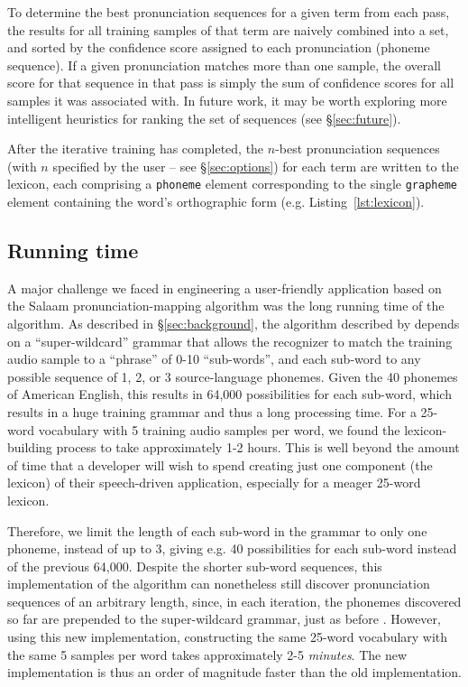 \documentclass[11pt]{article}
\begin{document}
To determine the best pronunciation sequences for a given term from each pass, the results for all training samples of that term are naively combined into a set, and sorted by the confidence score assigned to each pronunciation (phoneme sequence). If a given pronunciation matches more than one sample, the overall score for that sequence in that pass is simply the sum of confidence scores for all samples it was associated with. In future work, it may be worth exploring more intelligent heuristics for ranking the set of sequences (see \S\ref{sec:future}).

After the iterative training has completed, the $n$-best pronunciation sequences (with $n$ specified by the user -- see \S\ref{sec:options}) for each term are written to the lexicon, each comprising a \texttt{phoneme} element corresponding to the single \texttt{grapheme} element containing the word's orthographic form (e.g. Listing~\ref{lst:lexicon}).

\subsection{Running time}
\label{sec:runningtime}

A major challenge we faced in engineering a user-friendly application based on the Salaam pronunciation-mapping algorithm \cite{Qiao10} was the long running time of the algorithm. As described in \S\ref{sec:background}, the algorithm described by  depends on a ``super-wildcard'' grammar that allows the recognizer to match the training audio sample to a ``phrase'' of 0-10 ``sub-words'', and each sub-word to any possible sequence of 1, 2, or 3 source-language phonemes. Given the 40 phonemes of American English, this results in 64,000 possibilities for each sub-word, which results in a huge training grammar and thus a long processing time. For a 25-word vocabulary with 5 training audio samples per word, we found the lexicon-building process to take approximately 1-2 hours. This is well beyond the amount of time that a developer will wish to spend creating just one component (the lexicon) of their speech-driven application, especially for a meager 25-word lexicon. 

Therefore, we limit the length of each sub-word in the grammar to only one phoneme, instead of up to 3, giving e.g. 40 possibilities for each sub-word instead of the previous 64,000. Despite the shorter sub-word sequences, this implementation of the algorithm can nonetheless still discover pronunciation sequences of an arbitrary length, since, in each iteration, the phonemes discovered so far are prepended to the super-wildcard grammar, just as before \cite[p.~4]{Qiao10}. However, using this new implementation, constructing the same 25-word vocabulary with the same 5 samples per word takes approximately 2-5 \textit{minutes}. The new implementation is thus an order of magnitude faster than the old implementation.
\end{document}
